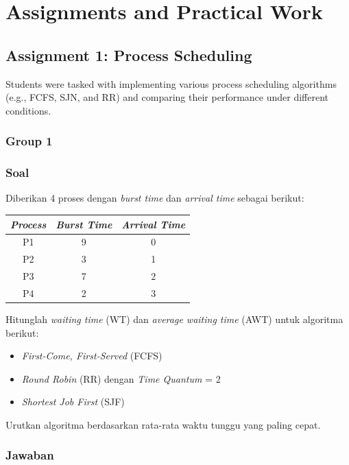 \documentclass[12pt]{article}
\begin{document}
\section{Assignments and Practical Work}
\subsection{Assignment 1: Process Scheduling}
Students were tasked with implementing various process scheduling algorithms (e.g., FCFS, SJN, and RR) and comparing their performance under different conditions.
\subsubsection{Group 1}
\subsubsection*{Soal}

Diberikan 4 proses dengan \textit{burst time} dan \textit{arrival time} sebagai berikut:

\begin{center}
    \begin{tabular}{|c|c|c|}
        \hline
        \textit{\textbf{Process}} & \textit{\textbf{Burst Time}} & \textit{\textbf{Arrival Time}} \\
        \hline
        P1 & 9 & 0 \\
        P2 & 3 & 1 \\
        P3 & 7 & 2 \\
        P4 & 2 & 3 \\
        \hline
    \end{tabular}
\end{center}

Hitunglah \textit{waiting time} (WT) dan \textit{average waiting time} (AWT) untuk algoritma berikut:

\begin{itemize}
    \item \textit{First-Come, First-Served} (FCFS)
    \item \textit{Round Robin} (RR) dengan \textit{Time Quantum} = 2
    \item \textit{Shortest Job First} (SJF)
\end{itemize}

Urutkan algoritma berdasarkan rata-rata waktu tunggu yang paling cepat.

\subsubsection*{Jawaban}
\end{document}
